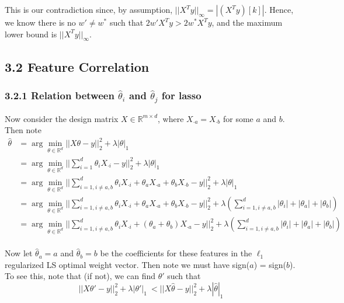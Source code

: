 \documentclass[paper=a4, fontsize=11pt]{scrartcl} %
\numberwithin{equation}{section} %
\numberwithin{figure}{section} %
\numberwithin{table}{section} %
\begin{document}
This is our contradiction since, by assumption, $||X^Ty||_\infty = |(X^Ty)[k]|$. Hence, we know there is no $w' \ne w^*$ such that $2w'X^Ty > 2w^* X^Ty$, and the maximum lower bound is $||X^Ty||_\infty$.


\subsection*{3.2 Feature Correlation}

\subsubsection*{3.2.1 Relation between $\hat{\theta}_i$ and $\hat{\theta}_j$ for lasso}

Now consider the design matrix $X \in \mathbb{R}^{m \times d}$, where $X_{\cdot a} = X_{\cdot b}$ for some $a$ and $b$.  Then note
\begin{align*}
\hat{\theta} &= \arg \min_{\theta \in \mathbb{R}^d} ||X\theta - y||_2^2 + \lambda |\theta|_1 \\
	&= \arg \min_{\theta \in \mathbb{R}^d} ||\sum_{i=1}^d \theta_i X_{\cdot i} - y||_2^2 + \lambda |\theta|_1 \\
	&= \arg \min_{\theta \in \mathbb{R}^d} ||\sum_{i=1, i \ne a, b}^d \theta_i X_{\cdot i} + \theta_a X_{\cdot a} +  \theta_b X_{\cdot b}- y||_2^2 + \lambda |\theta|_1 \\
	&= \arg \min_{\theta \in \mathbb{R}^d} ||\sum_{i=1, i \ne a, b}^d \theta_i X_{\cdot i} + \theta_a X_{\cdot a} +  \theta_b X_{\cdot b}- y||_2^2 + \lambda \left(\sum_{i=1, i \ne a, b}^d |\theta_i| + |\theta_a| + |\theta_b| \right)  \\
	&= \arg \min_{\theta \in \mathbb{R}^d} ||\sum_{i=1, i \ne a, b}^d \theta_i X_{\cdot i} +  (\theta_a  + \theta_b) X_{\cdot a}- y||_2^2 + \lambda \left(\sum_{i=1, i \ne a, b}^d |\theta_i| + |\theta_a| + |\theta_b| \right)  \\
\end{align*}

Now let $\hat{\theta}_{a} = a$ and $\hat{\theta}_{b} = b$ be the coefficients for these features in the $\ell_1$ regularized LS optimal weight vector. Then note we must have sign($a$) = sign($b$). To see this, note that (if not), we can find $\theta'$ such that
\[||X\theta' - y||_2^2 + \lambda |\theta'|_1\ < ||X\hat{\theta} - y||_2^2 + \lambda |\hat{\theta}|_1\ \]
\end{document}
